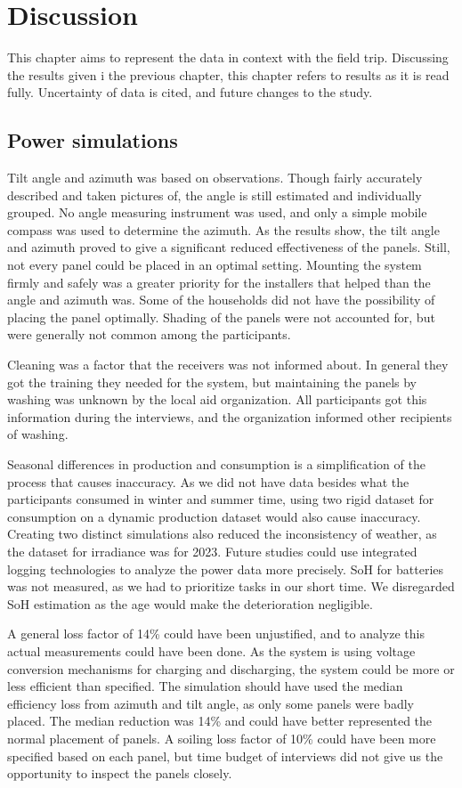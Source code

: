 
\chapter{Discussion}
\label{ch:discussion}
This chapter aims to represent the data in context with the field trip. Discussing the results given i the previous chapter, this chapter refers to results as it is read fully. Uncertainty of data is cited, and future changes to the study. 
\section{Power simulations}
Tilt angle and azimuth was based on observations. Though fairly accurately described and taken pictures of, the angle is still estimated and individually grouped. No angle measuring instrument was used, and only a simple mobile compass was used to determine the azimuth. As the results show, the tilt angle and azimuth proved to give a significant reduced effectiveness of the panels. Still, not every panel could be placed in an optimal setting. Mounting the system firmly and safely was a greater priority for the installers that helped than the angle and azimuth was. Some of the households did not have the possibility of placing the panel optimally. Shading of the panels were not accounted for, but were generally not common among the participants.

Cleaning was a factor that the receivers was not informed about. In general they got the training they needed for the system, but maintaining the panels by washing was unknown by the local aid organization. All participants got this information during the interviews, and the organization informed other recipients of washing.

Seasonal differences in production and consumption is a simplification of the process that causes inaccuracy. As we did not have data besides what the participants consumed in winter and summer time, using two rigid dataset for consumption on a dynamic production dataset would also cause inaccuracy. Creating two distinct simulations also reduced the inconsistency of weather, as the dataset for irradiance was for 2023. Future studies could use integrated logging technologies to analyze the power data more precisely. SoH for batteries was not measured, as we had to prioritize tasks in our short time. We disregarded SoH estimation as the age would make the deterioration negligible. 

A general loss factor of 14\% could have been unjustified, and to analyze this actual measurements could have been done. As the system is using voltage conversion mechanisms for charging and discharging, the system could be more or less efficient than specified. The simulation should have used the median efficiency loss from azimuth and tilt angle, as only some panels were badly placed. The median reduction was 14\% and could have better represented the normal placement of panels. A soiling loss factor of 10\% could have been more specified based on each panel, but time budget of interviews did not give us the opportunity to inspect the panels closely.

